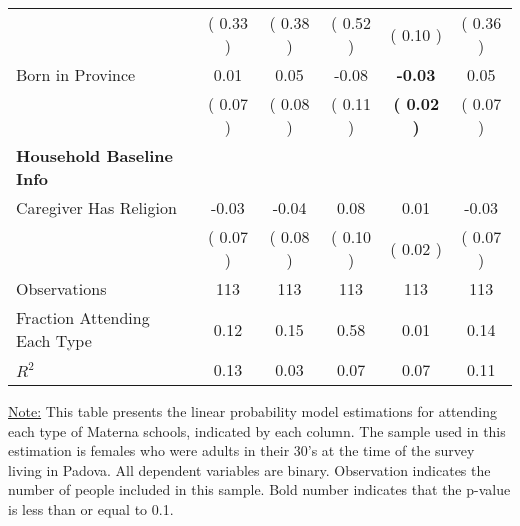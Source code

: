 \begin{table}[H]
{\begin{tabular}{lccccc}
\quad  & (     0.33 ) & (     0.38 )  & (     0.52 )  & (     0.10 ) & (     0.36 ) \\
\quad Born in Province &      0.01 &      0.05 &     -0.08 & \textbf{    -0.03} &      0.05 \\
\quad  & (     0.07 ) & (     0.08 )  & (     0.11 )  & \textbf{(     0.02 )} & (     0.07 ) \\
\midrule
\textbf{Household Baseline Info} \\
\quad Caregiver Has Religion &     -0.03 &     -0.04 &      0.08 &      0.01 &     -0.03 \\
\quad  & (     0.07 ) & (     0.08 )  & (     0.10 )  & (     0.02 ) & (     0.07 ) \\
\midrule
Observations & 113 & 113 & 113 & 113 & 113 \\
Fraction Attending Each Type &      0.12 &      0.15 &      0.58 &      0.01 &      0.14 \\
\midrule
$ R^2$ &      0.13 &      0.03 &      0.07 &      0.07 &      0.11 \\
\bottomrule
\end{tabular}}
\end{table}
\begin{footnotesize}
\noindent\underline{Note:} This table presents the linear probability model estimations for attending each type of Materna schools, indicated by each column. The sample used in this estimation is females who were adults in their 30's at the time of the survey living in Padova. All dependent variables are binary. Observation indicates the number of people included in this sample. Bold number indicates that the p-value is less than or equal to 0.1.
\end{footnotesize}
